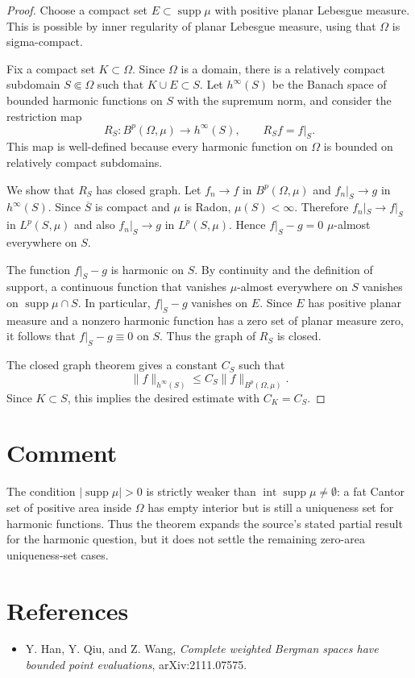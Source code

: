 \documentclass[11pt]{article}
\newcommand{\supp}{\operatorname{supp}}
\begin{document}
\begin{proof}
Choose a compact set $E\subset \supp\mu$ with positive planar Lebesgue
measure. This is possible by inner regularity of planar Lebesgue measure,
using that $\Omega$ is sigma-compact.

Fix a compact set $K\subset\Omega$. Since $\Omega$ is a domain, there is a
relatively compact subdomain $S\Subset\Omega$ such that $K\cup E\subset S$.
Let $h^\infty(S)$ be the Banach space of bounded harmonic functions on $S$
with the supremum norm, and consider the restriction map
\[
  R_S:B^p(\Omega,\mu)\longrightarrow h^\infty(S),
  \qquad R_S f=f|_S .
\]
This map is well-defined because every harmonic function on $\Omega$ is
bounded on relatively compact subdomains.

We show that $R_S$ has closed graph. Let $f_n\to f$ in $B^p(\Omega,\mu)$ and
$f_n|_S\to g$ in $h^\infty(S)$. Since $\overline S$ is compact and $\mu$ is
Radon, $\mu(S)<\infty$. Therefore $f_n|_S\to f|_S$ in $L^p(S,\mu)$ and also
$f_n|_S\to g$ in $L^p(S,\mu)$. Hence $f|_S-g=0$ $\mu$-almost everywhere on
$S$.

The function $f|_S-g$ is harmonic on $S$. By continuity and the definition of
support, a continuous function that vanishes $\mu$-almost everywhere on $S$
vanishes on $\supp\mu\cap S$. In particular, $f|_S-g$ vanishes on $E$.
Since $E$ has positive planar measure and a nonzero harmonic function has a
zero set of planar measure zero, it follows that $f|_S-g\equiv 0$ on $S$.
Thus the graph of $R_S$ is closed.

The closed graph theorem gives a constant $C_S$ such that
\[
  \|f\|_{h^\infty(S)}\leq C_S\|f\|_{B^p(\Omega,\mu)} .
\]
Since $K\subset S$, this implies the desired estimate with $C_K=C_S$.
\end{proof}

\section*{Comment}

The condition $|\supp\mu|>0$ is strictly weaker than
$\operatorname{int}\supp\mu\neq\emptyset$: a fat Cantor set of positive area
inside $\Omega$ has empty interior but is still a uniqueness set for harmonic
functions. Thus the theorem expands the source's stated partial result for
the harmonic question, but it does not settle the remaining zero-area
uniqueness-set cases.

\section*{References}

\begin{itemize}
\item Y. Han, Y. Qiu, and Z. Wang, \emph{Complete weighted Bergman spaces have
bounded point evaluations}, arXiv:2111.07575.
\end{itemize}
\end{document}
